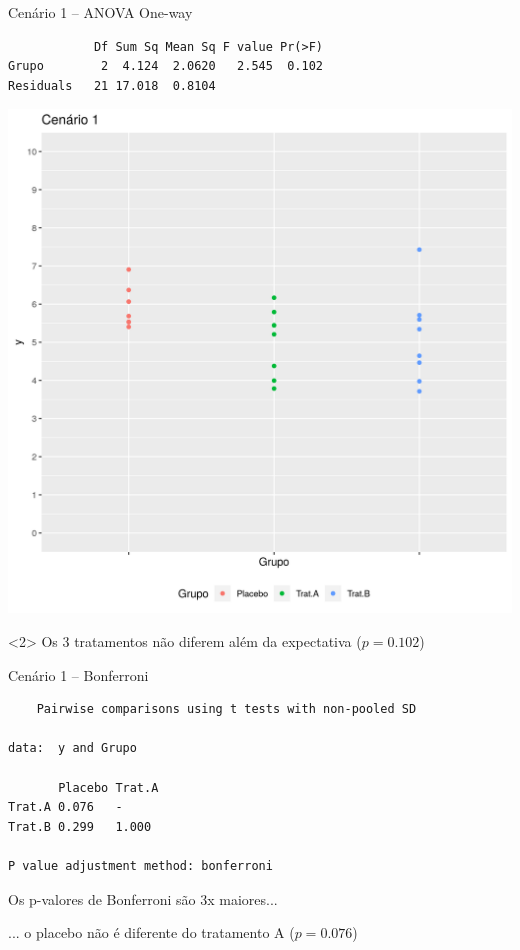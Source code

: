 \documentclass{beamer}
\begin{document}
\begin{frame}[fragile, label=cenario1-1way]
  \begin{exampleblock}{Cenário 1 -- ANOVA One-way}
    \tiny
\begin{verbatim}
            Df Sum Sq Mean Sq F value Pr(>F)
Grupo        2  4.124  2.0620   2.545  0.102
Residuals   21 17.018  0.8104
\end{verbatim}
    \begin{center}
      \includegraphics[height=.5\textheight]{Cap13-30/cenario1}
    \end{center}
  \end{exampleblock}
  \begin{block}{}<2>
    \small
    Os 3 tratamentos não diferem além da expectativa ($p=0.102$)
  \end{block}
\end{frame}


\begin{frame}[fragile]
  \begin{exampleblock}{Cenário 1 -- Bonferroni}
    \scriptsize
\begin{verbatim}
	Pairwise comparisons using t tests with non-pooled SD 

data:  y and Grupo 

       Placebo Trat.A
Trat.A 0.076   -     
Trat.B 0.299   1.000 

P value adjustment method: bonferroni
\end{verbatim}
  \end{exampleblock}
  \begin{block}{}
    \small
    Os p-valores de Bonferroni são 3x maiores...

    \bigskip
    ... o placebo não é diferente do tratamento A ($p=0.076$)
  \end{block}
\end{frame}
\end{document}
